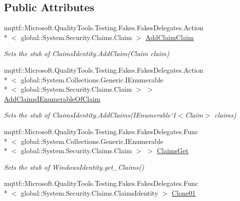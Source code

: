\subsection*{Public Attributes}
\begin{DoxyCompactItemize}
\item 
mqttf\-::\-Microsoft.\-Quality\-Tools.\-Testing.\-Fakes.\-Fakes\-Delegates.\-Action\\*
$<$ global\-::\-System.\-Security.\-Claims.\-Claim $>$ \hyperlink{class_system_1_1_security_1_1_principal_1_1_fakes_1_1_stub_windows_identity_a613517b01176601b9147c89e5410eba1}{Add\-Claim\-Claim}
\begin{DoxyCompactList}\small\item\em Sets the stub of Claims\-Identity.\-Add\-Claim(\-Claim claim)\end{DoxyCompactList}\item 
mqttf\-::\-Microsoft.\-Quality\-Tools.\-Testing.\-Fakes.\-Fakes\-Delegates.\-Action\\*
$<$ global\-::\-System.\-Collections.\-Generic.\-I\-Enumerable\\*
$<$ global\-::\-System.\-Security.\-Claims.\-Claim $>$ $>$ \hyperlink{class_system_1_1_security_1_1_principal_1_1_fakes_1_1_stub_windows_identity_ae2f806f43e19366de66515a6dda6677e}{Add\-Claims\-I\-Enumerable\-Of\-Claim}
\begin{DoxyCompactList}\small\item\em Sets the stub of Claims\-Identity.\-Add\-Claims(I\-Enumerable`1$<$Claim$>$ claims)\end{DoxyCompactList}\item 
mqttf\-::\-Microsoft.\-Quality\-Tools.\-Testing.\-Fakes.\-Fakes\-Delegates.\-Func\\*
$<$ global\-::\-System.\-Collections.\-Generic.\-I\-Enumerable\\*
$<$ global\-::\-System.\-Security.\-Claims.\-Claim $>$ $>$ \hyperlink{class_system_1_1_security_1_1_principal_1_1_fakes_1_1_stub_windows_identity_a6535535f0bcc3180e795944483be0e13}{Claims\-Get}
\begin{DoxyCompactList}\small\item\em Sets the stub of Windows\-Identity.\-get\-\_\-\-Claims()\end{DoxyCompactList}\item 
mqttf\-::\-Microsoft.\-Quality\-Tools.\-Testing.\-Fakes.\-Fakes\-Delegates.\-Func\\*
$<$ global\-::\-System.\-Security.\-Claims.\-Claims\-Identity $>$ \hyperlink{class_system_1_1_security_1_1_principal_1_1_fakes_1_1_stub_windows_identity_ac09e81aa53837049871a8ca89b96f598}{Clone01}

\end{DoxyCompactItemize}
